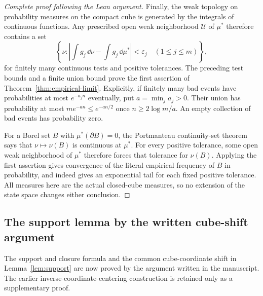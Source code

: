 \begin{proof}[Complete proof following the Lean argument]
Finally, the weak topology on probability measures on the compact cube is
generated by the integrals of continuous functions. Any prescribed open
weak neighborhood $\mathcal U$ of $\mu^\ast$ therefore contains a set
\[
 \left\{\nu:
   \left|\int g_j\,\dd\nu-\int g_j\,\dd\mu^\ast\right|
      <\varepsilon_j\quad(1\le j\le m)\right\},
\]
for finitely many continuous tests and positive tolerances. The preceding
test bounds and a finite union bound prove the first assertion of
Theorem~\ref{thm:empirical-limit}. Explicitly, if finitely many bad events
have probabilities at most $e^{-a_jn}$ eventually, put
$a=\min_j a_j>0$. Their union has probability at most
$m e^{-an}\le e^{-an/2}$ once $n\ge2\log m/a$.
An empty collection of bad events has probability zero.

For a Borel set $B$ with $\mu^\ast(\partial B)=0$, the
Portmanteau continuity-set theorem says that
$\nu\mapsto\nu(B)$ is continuous at $\mu^\ast$.
For every positive tolerance, some open weak neighborhood of $\mu^\ast$
therefore forces that tolerance for $\nu(B)$.
Applying the first assertion gives convergence of the literal empirical
frequency of $B$ in probability, and indeed gives an exponential tail
for each fixed positive tolerance. All measures here are the actual
closed-cube measures, so no extension of the state space changes either
conclusion.
\end{proof}

\subsection{The support lemma by the written cube-shift argument}
\label{leanproof:ANT-2-2}

The support and closure formula and the common cube-coordinate shift in
Lemma~\ref{lem:support} are now proved by the argument written in the
manuscript. The earlier inverse-coordinate-centering construction is
retained only as a supplementary proof.

